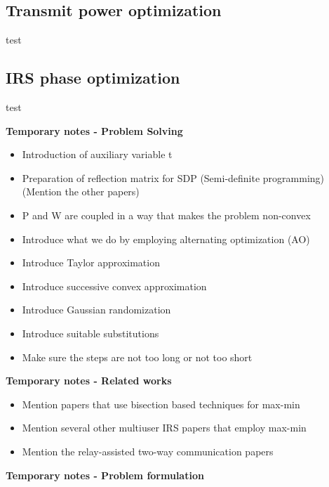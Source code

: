 \documentclass[lettersize,journal]{IEEEtran}
\begin{document}



\subsection{Transmit power optimization}

test

\subsection{IRS phase optimization}

test


\textbf{Temporary notes - Problem Solving}

\begin{itemize}

\item Introduction of auxiliary variable t
\item Preparation of reflection matrix for SDP (Semi-definite programming) (Mention the other papers)
\item P and W are coupled in a way that makes the problem non-convex
\item Introduce what we do by employing alternating optimization (AO)
\item Introduce Taylor approximation
\item Introduce successive convex approximation
\item Introduce Gaussian randomization
\item Introduce suitable substitutions
\item Make sure the steps are not too long or not too short


\end{itemize}

\textbf{Temporary notes - Related works}

\begin{itemize}

\item Mention papers that use bisection based techniques for max-min 
\item Mention several other multiuser IRS papers that employ max-min
\item Mention the relay-assisted two-way communication papers

\end{itemize}

\textbf{Temporary notes - Problem formulation}
\end{document}
